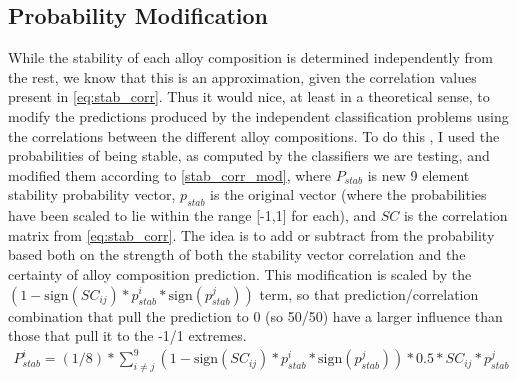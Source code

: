 \documentclass[11pt]{article}
\begin{document}
\subsection{Probability Modification}
\noindent While the stability of each alloy composition is determined independently from the rest, we know that this is an approximation, given the correlation values present in \eqref{eq:stab_corr}. Thus it would nice, at least in a theoretical sense, to modify the predictions produced by the independent classification problems using the correlations between the different alloy compositions. To do this , I used the probabilities of being stable, as computed by the classifiers we are testing, and modified them according to \eqref{stab_corr_mod}, where $P_{stab}$ is new 9 element stability probability vector, $p_{stab}$ is the original vector (where the probabilities have been scaled to lie within the range [-1,1] for each), and $SC$ is the correlation matrix from \eqref{eq:stab_corr}. The idea is to add or subtract from the probability based both on the strength of both the stability vector correlation and the certainty of alloy composition prediction. This modification is scaled by the $ \left(1-\textrm{sign}(SC_{ij})*p^i_{stab}*\textrm{sign}(p^j_{stab})\right)$ term, so that prediction/correlation combination that pull the prediction to 0 (so 50/50) have a larger influence than those that pull it to the -1/1 extremes. 
\begin{align}
\label{stab_corr_mod}
P^i_{stab} =(1/8) * \sum_{i\neq j}^{9} \left(1-\textrm{sign}(SC_{ij})*p^i_{stab}*\textrm{sign}(p^j_{stab})\right)*0.5*SC_{ij}*p^j_{stab}
\end{align}
\end{document}
